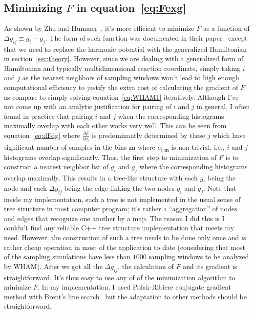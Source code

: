 \subsection{Minimizing $F$ in equation~\ref{eq:Fexg}}
As shown by Zhu and Hummer~\cite{Zhu2012}, it's more efficient to minimize $F$
as a function of $\Delta g_{ij} \equiv g_{i} - g_{j}$.  The form of such
function was documented in their paper~\cite{Zhu2012} except that we need to
replace the harmonic potential with the generalized Hamiltonian in
section~\ref{sec:theory}. However, since we are dealing with a generalized form
of Hamiltonian and typically multidimensional reaction coordinate, simply
taking $i$ and $j$ as the nearest neighbors of sampling windows won't lead to
high enough computational efficiency to justify the extra cost of calculating
the gradient of $F$ as compare to simply solving equation~\ref{eq:WHAM1}
iteratively. Although I've not come up with an analytic justification for
pairing of $i$ and $j$ in general, I often found in practice that pairing $i$
and $j$ when the corresponding histograms maximally overlap with each other
works very well. This can be seen from equation~\ref{eq:dFdg} where
$\frac{\partial F}{\partial g_{i}}$ is predominantly determined by those $j$
which have significant number of samples in the bins $\mathbf{m}$ where
$c_{i,\mathbf{m}}$ is non trivial, i.e., $i$ and $j$ histograms overlap significantly.
Thus, the first step to minimization of $F$ is to construct a nearest neighbor 
list of $g_{i}$ and $g_{j}$ where the corresponding histograms overlap maximally.
This results in a tree-like structure with each $g_{i}$ being the node and 
each $\Delta g_{ij}$ being the edge linking the two nodes $g_{i}$ and $g_{j}$.
Note that inside my implementation, such a tree is not implemented in the 
usual sense of tree structure in most computer program; it's rather a 
``aggregation'' of nodes and edges that recognize one another by a map. 
The reason I did this is I couldn't find any reliable C++ tree structure 
implementation that meets my need. However, the construction of such a 
tree needs to be done only once and is rather cheap operation in most of 
the application to date (considering that most of the sampling simulations
have less than $1000$ sampling windows to be analyzed by WHAM). After
we got all the $\Delta g_{ij}$, the calculation of $F$ and its gradient
is straightforward. It's thus easy to use any of of the minimization 
algorithm to minimize $F$. In my implementation, I used Polak-Ribiere 
conjugate gradient method with Brent’s line search~\cite{NumRec2007} but 
the adaptation to other methods should be straightforward. 

